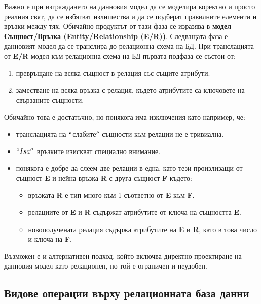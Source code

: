 \documentclass[fleqn,12pt]{article}
\begin{document}
Важно е при изграждането на данновия модел да се моделира коректно и просто реалния свят, да се избягват излишества и да се подберат правилните елементи и връзки между тях.
Обичайно продуктът от тази фаза се изразява в \textbf{модел Същност/Връзка (Entity/Relationship (E/R))}.
\bigbreak
Следващата фаза е данновият модел да се транслира до релационна схема на БД.
При транслацията от \textbf{E/R} модел към релационна схема на БД първата подфаза се състои от:
\begin{enumerate}
    \item превръщане на всяка същност в релация със същите атрибути.
    \item заместване на всяка връзка с релация, където атрибутите са ключовете на свързаните същности.
\end{enumerate}

Обичайно това е достатъчно, но понякога има изключения като например, че:
\begin{itemize}
    \item транслацията на $``$слабите$''$ същности към релации не е тривиална.
    \item $``Isa''$ връзките изискват специално внимание.
    \item понякога е добре да слеем две релации в една, като тези произлизащи от същност \textbf{E} и нейна връзка \textbf{R} с друга същност \textbf{F} където:
    \begin{itemize}
        \item връзката \textbf{R} е тип много към 1 съответно от \textbf{E} към \textbf{F}.
        \item релациите от \textbf{E} и \textbf{R} съдържат атрибутите от ключа на същността \textbf{E}.
        \item новополучената релация съдържа атрибутите на \textbf{E} и \textbf{R}, като в това число и ключа на \textbf{F}.
    \end{itemize}
\end{itemize}

Възможен е и алтернативен подход, който включва директно проектиране на данновия модел като релационен, но той е ограничен и неудобен.


\subsection{Видове операции върху релационната база данни}
\end{document}
